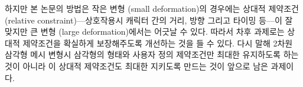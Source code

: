 \documentclass[12pt,a4paper,oneside,final]{report}
\begin{document}
하지만 본 논문의 방법은 작은 변형 (small deformation)의 경우에는 상대적
제약조건 (relative constraint)---상호작용시 캐릭터 간의 거리, 방향 그리고
타이밍 등---이 잘 맞지만 큰 변형 (large deformation)에서는 어긋날 수 있다.
따라서 차후 과제로는 상대적 제약조건을 확실하게 보장해주도록 개선하는 것을 들
수 있다. 다시 말해 2차원 삼각형 메시 변형시 삼각형의 형태와 사용자 정의
제약조건만 최대한 유지하도록 하는 것이 아니라 이 상대적 제약조건도 최대한
지키도록 만드는 것이 앞으로 남은 과제이다.

\printbibliography
\end{document}
